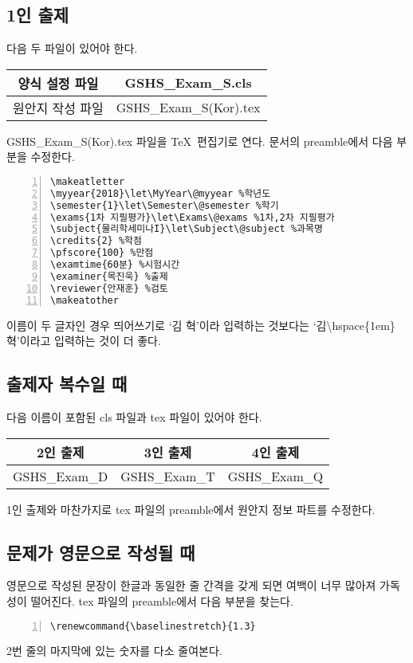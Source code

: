\documentclass[]{gshs_exam_S}
\renewcommand{\baselinestretch}{1.3}
\begin{document}
\begin{multicols*}{2}
\subsection{1인 출제}
다음 두 파일이 있어야 한다.
\begin{center}\ttfamily\small
\begin{tabular}{c|c}
\hline
{\footnotesize 양식 설정 파일}& GSHS\_Exam\_S.cls\\
\hline
{\footnotesize 원안지 작성 파일}& GSHS\_Exam\_S(Kor).tex\\
\hline
\end{tabular}
\end{center}
GSHS\_Exam\_S(Kor).tex 파일을 \TeX\ 편집기로 연다. 문서의 preamble에서 다음 부분을 수정한다.
\begin{Verbatim}[frame=single,fontsize=\footnotesize,numbers=left,xleftmargin=5mm]
\makeatletter
\myyear{2018}\let\MyYear\@myyear %학년도
\semester{1}\let\Semester\@semester %학기
\exams{1차 지필평가}\let\Exams\@exams %1차,2차 지필평가
\subject{물리학세미나I}\let\Subject\@subject %과목명
\credits{2} %학점
\pfscore{100} %만점
\examtime{60분} %시험시간
\examiner{목진욱} %출제
\reviewer{안재훈} %검토
\makeatother
\end{Verbatim}
이름이 두 글자인 경우 띄어쓰기로 `{\ttfamily 김 혁}'이라 입력하는 것보다는 `{\ttfamily 김{\textbackslash}hspace\{1em\}혁}'이라고 입력하는 것이 더 좋다.

\subsection{출제자 복수일 때}
다음 이름이 포함된 cls 파일과 tex 파일이 있어야 한다.
\begin{center}\ttfamily\small
\begin{tabular}{c|c|c}
\hline
{\footnotesize 2인 출제}&{\footnotesize 3인 출제}&{\footnotesize 4인 출제}\\
\hline
GSHS\_Exam\_D&GSHS\_Exam\_T&GSHS\_Exam\_Q\\
\hline
\end{tabular}
\end{center}
1인 출제와 마찬가지로 tex 파일의 preamble에서 원안지 정보 파트를 수정한다.

\subsection{문제가 영문으로 작성될 때}
영문으로 작성된 문장이 한글과 동일한 줄 간격을 갖게 되면 여백이 너무 많아져 가독성이 떨어진다. tex 파일의 preamble에서 다음 부분을 찾는다.
\begin{Verbatim}[frame=single,fontsize=\footnotesize,numbers=left,xleftmargin=5mm]
%% 한글줄간격 %%
\renewcommand{\baselinestretch}{1.3}
\end{Verbatim}
2번 줄의 마지막에 있는 숫자를 다소 줄여본다.


\end{multicols*}
\end{document}
